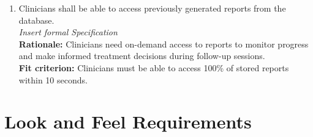 \documentclass[12pt]{article}
\begin{document}
\begin{enumerate}[{FR-DPD}5. ]
  \item Clinicians shall be able to access previously generated reports from the database.\\
  \textit{Insert formal Specification}\\
  \textbf{Rationale: }Clinicians need on-demand access to reports to monitor progress and make informed treatment decisions during follow-up sessions.\\
  \textbf{Fit criterion: }Clinicians must be able to access 100\% of stored reports within 10 seconds.  
\end{enumerate}

\section{Look and Feel Requirements}
\end{document}
